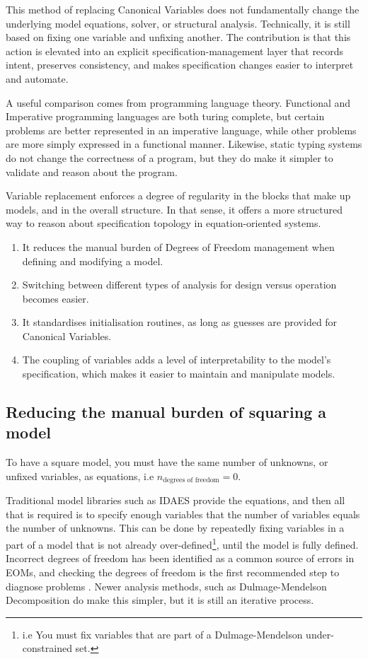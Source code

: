 This method of replacing Canonical Variables does not fundamentally change
the underlying model equations, solver, or structural analysis.
Technically, it is still based on fixing one variable and unfixing
another. The contribution is that this action is elevated into an
explicit specification-management layer that records intent, preserves
consistency, and makes specification changes easier to interpret and
automate.

A useful comparison comes from programming language theory.
Functional and Imperative programming languages are both turing
complete, but certain problems are better represented in an imperative
language, while other problems are more simply expressed in a functional
manner. Likewise, static typing systems do not change the correctness of
a program, but they do make it simpler to validate and reason about the
program.

Variable replacement enforces a degree of regularity in the blocks that
make up models, and in the overall structure. In that sense, it offers
a more structured way to reason about specification topology in
equation-oriented systems.

\begin{enumerate}
\def\labelenumi{\arabic{enumi}.}
\tightlist
\item
  It reduces the manual burden of Degrees of Freedom management when
  defining and modifying a model.
\item
  Switching between different types of analysis for design versus
  operation becomes easier.
\item
  It standardises initialisation routines, as long as guesses are
  provided for Canonical Variables.
\item
  The coupling of variables adds a level of interpretability to the
  model's specification, which makes it easier to maintain and
  manipulate models.
\end{enumerate}

\hypertarget{removing-the-problem-of-squaring-a-model}{%
\subsection{Reducing the manual burden of squaring a
model}\label{removing-the-problem-of-squaring-a-model}}

To have a square model, you must have the same number of unknowns, or
unfixed variables, as equations, i.e
\(n_{\text{degrees\ of\ freedom}} = 0\).

Traditional model libraries such as IDAES provide the equations, and
then all that is required is to specify enough variables that the number
of variables equals the number of unknowns. This can be done by
repeatedly fixing variables in a part of a model that is not already
over-defined\footnote{i.e You must fix variables that are part of a
  Dulmage-Mendelson under-constrained set.}, until the model is fully
defined. Incorrect degrees of freedom has been identified as a common
source of errors in EOMs, and checking the degrees of freedom is the
first recommended step to diagnose problems \citep{lee2024model}. Newer
analysis methods, such as Dulmage-Mendelson Decomposition do make this
simpler, but it is still an iterative process.

